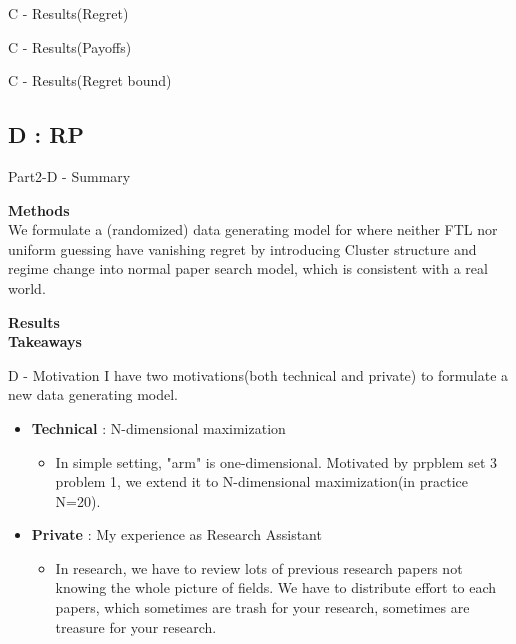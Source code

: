 \documentclass{beamer}
\begin{document}
\begin{frame}{C - Results(Regret)}

    
\end{frame}


\begin{frame}{C - Results(Payoffs)}

    
\end{frame}

\begin{frame}{C - Results(Regret bound)}

    
\end{frame}



\subsection{D : RP}

\begin{frame}{Part2-D - Summary}

\textbf{Methods}\\
We formulate a (randomized) data generating model for where neither FTL nor uniform guessing have vanishing regret by introducing Cluster structure and regime change into normal paper search model, which is consistent with a real world.

\vspace{1em}
\textbf{Results}\\



\vspace{1em}
\textbf{Takeaways}\\


\end{frame}

\begin{frame}{D - Motivation}
I have two motivations(both technical and private) to formulate a new data generating model.
    \begin{itemize}
        \item \textbf{Technical} : N-dimensional maximization
        \begin{itemize}
            \item In simple setting, "arm" is one-dimensional. Motivated by prpblem set 3 problem 1, we extend it to N-dimensional maximization(in practice N=20).
        \end{itemize}
        \item \textbf{Private} : My experience as Research Assistant
        \begin{itemize}
            \item In research, we have to review lots of previous research papers not knowing the whole picture of fields. We have to distribute effort to each papers, which sometimes are trash for your research, sometimes are treasure for your research.
        \end{itemize}
    \end{itemize}
\end{frame}
\end{document}
